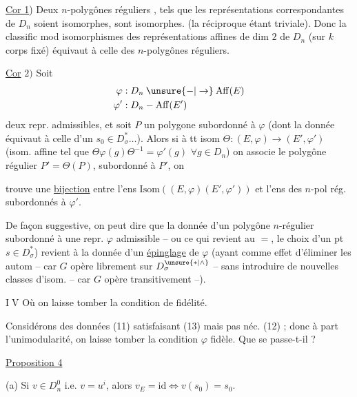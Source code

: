 \uline{Cor 1}) Deux $n$-polygônes réguliers  , tels que les représentations correspondantes de $D_n$ soient isomorphes, sont isomorphes. (la réciproque étant triviale). Donc la classific mod isomorphismes des représentations affines  de dim $2$ de $D_n$ (sur $k$ corps fixé) équivaut à celle des $n$-polygônes réguliers.

\uline{Cor} $2)$ Soit
\[
\begin{aligned}
\varphi &:D_n\mathbin{\unsure{-|\to}}\mathrm{Aff}(E)\\
\varphi' &:D_n\mathbin{-}\mathrm{Aff}(E')
\end{aligned}
\]
deux repr. admissibles, et soit $P$ un polygone  subordonné à $\varphi$ (dont la donnée équivaut à celle d'un $s_0\in D_\sigma^*\ldots$). Alors si à tt isom $\Theta:(E,\varphi)\to(E',\varphi')$ (isom. affine  tel que $\Theta\varphi(g)\Theta^{-1}=\varphi'(g)$ $\forall g\in D_n$) on associe le polygône régulier  $P'=\Theta(P)$, subordonné à $P'$, on

trouve une \uline{bijection}  entre l'ens   $\mathrm{Isom}((E,\varphi)(E',\varphi'))$ et l'ens des $n$-pol rég.  subordonnés à $\varphi'$.

De façon suggestive, on peut dire que la donnée d'un polygône $n$-régulier subordonné à une repr. $\varphi$ admissible -- ou ce qui revient au $=$, le choix d'un pt $s\in D_\sigma^*$) revient à la donnée d'un \uline{épinglage} de $\varphi$ (ayant comme effet d'éliminer les autom -- car $G$ opère librement sur $D_\sigma^{\unsure{*|\wedge}}$ -- sans introduire de nouvelles classes d'isom. -- car $G$ opère transitivement --).

\textcircled{\small IV} Où on laisse tomber la condition de fidélité.

Considérons des données (11) satisfaisant (13) mais pas néc. (12) ; donc à part l'unimodularité, on laisse tomber la condition $\varphi$ fidèle. Que se passe-t-il ?

\uline{Proposition 4}  

(a) Si $v\in D_n^0$ i.e. $v=u^i$, alors $v_E=\mathrm{id}\iff v(s_0)=s_0$.

